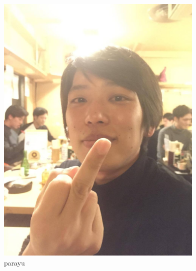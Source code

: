 \documentclass[10pt, dvipdfmx]{beamer}
\begin{document}
        \begin{frame}
            \frametitle{}
                \begin{figure}[htb]
                    \includegraphics[width=100mm]{images/05.png}
                    \caption{parayu}
                    \label{fig:03}
                \end{figure}
        \end{frame}
\end{document}
